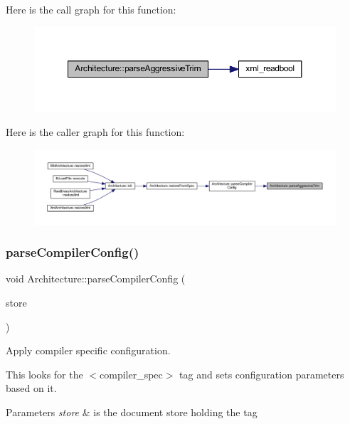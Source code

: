 Here is the call graph for this function\+:
\nopagebreak
\begin{figure}[H]
\begin{center}
\leavevmode
\includegraphics[width=350pt]{class_architecture_a8be334560223db2a9742d8097edf2cf6_cgraph}
\end{center}
\end{figure}
Here is the caller graph for this function\+:
\nopagebreak
\begin{figure}[H]
\begin{center}
\leavevmode
\includegraphics[width=350pt]{class_architecture_a8be334560223db2a9742d8097edf2cf6_icgraph}
\end{center}
\end{figure}
\mbox{\label{class_architecture_a20147b2a4be785c30ea29cc7d9278b42}} 
\subsubsection{\texorpdfstring{parseCompilerConfig()}{parseCompilerConfig()}}
{\footnotesize\ttfamily void Architecture\+::parse\+Compiler\+Config (\begin{DoxyParamCaption}\item[{\mbox{\hyperlink{class_document_storage}{Document\+Storage}} \&}]{store }\end{DoxyParamCaption})\hspace{0.3cm}{\ttfamily [protected]}}



Apply compiler specific configuration. 

This looks for the $<$compiler\+\_\+spec$>$ tag and sets configuration parameters based on it. 
\begin{DoxyParams}{Parameters}
{\em store} & is the document store holding the tag \\
\hline
\end{DoxyParams}


